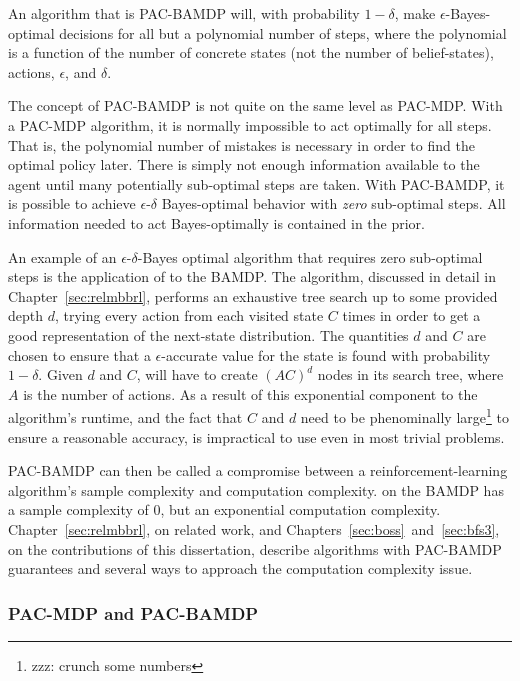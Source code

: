 An algorithm that is PAC-BAMDP will, with probability $1-\delta$, make $\epsilon$-Bayes-optimal decisions for all but a polynomial number of steps, where the polynomial is a function of the number of concrete states (not the number of belief-states), actions, $\epsilon$, and $\delta$.

The concept of PAC-BAMDP is not quite on the same level as PAC-MDP. With a PAC-MDP algorithm, it is normally impossible to act optimally for all steps. That is, the polynomial number of mistakes is necessary in order to find the optimal policy later. There is simply not enough information available to the agent until many potentially sub-optimal steps are taken. With PAC-BAMDP, it is possible to achieve $\epsilon$-$\delta$ Bayes-optimal behavior with \emph{zero} sub-optimal steps. All information needed to act Bayes-optimally is contained in the prior.

An example of an $\epsilon$-$\delta$-Bayes optimal algorithm that requires zero sub-optimal steps is the application of  to the BAMDP. The  algorithm, discussed in detail in Chapter~\ref{sec:relmbbrl}, performs an exhaustive tree search up to some provided depth $d$, trying every action from each visited state $C$ times in order to get a good representation of the next-state distribution. The quantities $d$ and $C$ are chosen to ensure that a $\epsilon$-accurate value for the state is found with probability $1-\delta$. Given $d$ and $C$,  will have to create $(A C)^d$ nodes in its search tree, where $A$ is the number of actions. As a result of this exponential component to the algorithm's runtime, and the fact that $C$ and $d$ need to be phenominally large\footnote{zzz: crunch some numbers} to ensure a reasonable accuracy,  is impractical to use even in most trivial problems.

PAC-BAMDP can then be called a compromise between a reinforcement-learning algorithm's sample complexity and computation complexity.  on the BAMDP has a sample complexity of $0$, but an exponential computation complexity. Chapter~\ref{sec:relmbbrl}, on related work, and Chapters~\ref{sec:boss}~and~\ref{sec:bfs3}, on the contributions of this dissertation, describe algorithms with PAC-BAMDP guarantees and several ways to approach the computation complexity issue.

\subsubsection{PAC-MDP and PAC-BAMDP}


